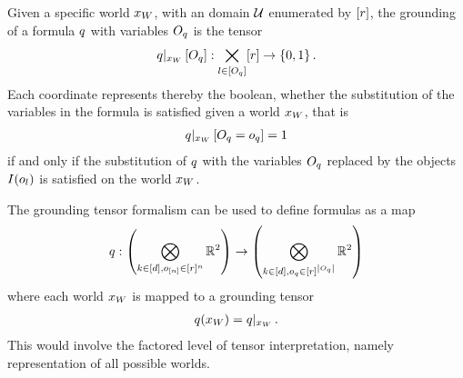 \begin{definition}
    Given a specific world $x_{W}$, with an domain $\mathcal{U}$ enumerated by $[r]$, the grounding of a formula $q$ with variables $O_{q}$  is the tensor
    \begin{align*}
        {q}|_{x_{W}} \left[O_{q}\right] :
        \bigtimes_{l\in[O_{q}]} [r] \rightarrow \{0,1\} \, .
    \end{align*}
    Each coordinate represents thereby the boolean, whether the substitution of the variables in the formula is satisfied given a world $x_{W}$, that is
    \begin{align*}
        {q}|_{x_{W}} \left[O_{q}=o_{q}\right] = 1
    \end{align*}
    if and only if the substitution of $q$ with the variables $O_{q}$ replaced by the objects $I(o_{l})$ is satisfied on the world $x_{W}$.
\end{definition}

The grounding tensor formalism can be used to define formulas as a map
\begin{align*}
    q : \left(\bigotimes_{k\in[d],o_{[n]}\in[r]^{n}}\mathbb{R}^{2}\right)
    \rightarrow \left(\bigotimes_{k\in[d],o_{q}\in[r]^{\left|O_{q}\right|}}\mathbb{R}^{2}\right)
\end{align*}
where each world $x_{W}$ is mapped to a grounding tensor
\begin{align*}
    q(x_{W}) = {q}|_{x_{W}} \, .
\end{align*}
This would involve the factored level of tensor interpretation, namely representation of all possible worlds.


